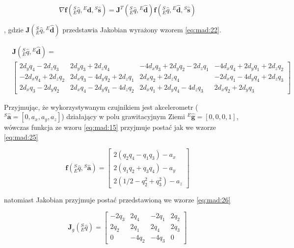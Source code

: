 \begin{equation}
	\nabla \mathbf{f}({^S_E \hat{q}},{^E\hat{\mathbf{d}}} , {^S\hat{\mathbf{s}}}) = \mathbf{J}^T ({^S_E \hat{q}},{^E\hat{\mathbf{d}}})\mathbf{f}({^S_E \hat{q}},{^E\hat{\mathbf{d}}} , {^S\hat{\mathbf{s}}})
	\label{eq:mad:20}
\end{equation}

, gdzie $\mathbf{J}({^S_E \hat{q}},{^E\hat{\mathbf{d}}})$ przedstawia Jakobian wyrażony wzorem \ref{eq:mad:22}.

\begin{equation}
	\begin{split}
		&\mathbf{J}({^S_E \hat{q}},{^E\hat{\mathbf{d}}}) = \\
		&\begin{bmatrix}
			2d_y q_4 - 2d_z q_3  & 2d_y q_3 + 2d_z q_4            & -4d_x q_3 + 2d_y q_2 - 2d_z q_1 & -4d_x q_4 + 2d_y q_1 + 2d_z q_2 \\
			-2d_x q_4 + 2d_z q_2 & 2d_x q_3 - 4d_y q_2 + 2d_z q_1 & 2d_x q_2 + 2d_z q_4             & -2d_x q_1 - 4d_y q_4 + 2d_z q_3 \\
			2d_x q_3 - 2d_y q_2  & 2d_x q_4 - 2d_y q_1 - 4d_z q_2 & 2d_x q_1 + 2d_y q_4 - 4d_z q_3  & 2d_x q_2 + 2d_y q_3             
		\end{bmatrix}
	\end{split}
	\label{eq:mad:22}
\end{equation}

Przyjmując, że wykorzystywanym czujnikiem jest akcelerometr (${^S\hat{\mathbf{a}}} = [0,a_x,a_y,a_z]$) działający w polu grawitacyjnym Ziemi ${^E\hat{\mathbf{g}}} = [0,0,0,1]$, wówczas funkcja ze wzoru \ref{eq:mad:15} przyjmuje postać jak we wzorze \ref{eq:mad:25}

\begin{equation}
	\mathbf{f}({^S_E \hat{q}},{^S\hat{\mathbf{a}}}) = 
	\begin{bmatrix}
		2(q_2 q_4 - q_1 q_3) - a_x   \\
		2(q_1 q_2 + q_3 q_4) - a_y   \\
		2(1/2 - q_2^2 + q_3^2) - a_z 
	\end{bmatrix}
	\label{eq:mad:25}
\end{equation}

natomiast Jakobian przyjmuje postać przedstawioną we wzorze \ref{eq:mad:26}

\begin{equation}
	\mathbf{J}_g({^S_E \hat{q}}) = 
	\begin{bmatrix}
		-2q_3 & 2q_4  & -2q_1 & 2q_2 \\
		2q_2  & 2q_1  & 2q_4  & 2q_3 \\
		0     & -4q_2 & -4q_3 & 0    
	\end{bmatrix}
	\label{eq:mad:26}
\end{equation}

